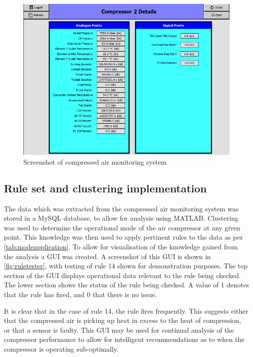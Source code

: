 \begin{figure}
\includegraphics[width = 0.9 \textwidth]{./Images/JACE_Screen.png}
\caption{Screenshot of compressed air monitoring system}
\label{fig:jacescreen}
\end{figure}


\subsection{Rule set and clustering implementation}
The data which was extracted from the compressed air monitoring system was stored in a MySQL database, to allow for analysis using MATLAB. Clustering was used to determine the operational mode of the air compressor at any given point. This knowledge was then used to apply pertinent rules to the data as per \autoref{tab:modeapplication}. To allow for visualisation of the knowledge gained from the analysis a GUI was created. A screenshot of this GUI is shown in \autoref{fig:ruletester}, with testing of rule 14 shown for demonstration purposes. The top section of the GUI displays operational data relevant to the rule being checked. The lower section shows the status of the rule being checked. A value of 1 denotes that the rule has fired, and 0 that there is no issue. 

It is clear that in the case of rule 14, the rule fires frequently. This suggests either that the compressed air is picking up heat in excess to the heat of compression, or that a sensor is faulty. This GUI may be used for continual analysis of the compressor performance to allow for intelligent recommendations as to when the compressor is operating sub-optimally.

